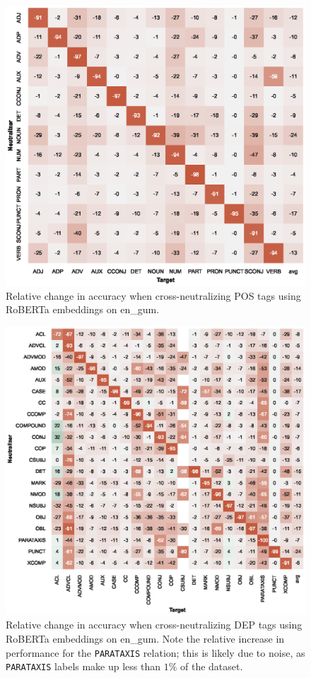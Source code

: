 \documentclass[11pt,a4paper]{article}
\begin{document}
\begin{figure}[t]
    \centering
    \includegraphics{full_figures/POS_xlm-roberta-base_en_gum_acc_drop_agg=max_probe=9.eps}
    \caption{Relative change in accuracy when cross-neutralizing POS tags using RoBERTa embeddings on en\_gum.}
    \label{fig:xneutr_roberta_pos_complete}
\end{figure}

\begin{figure}[t]
    \centering
    \includegraphics{full_figures/DEP_roberta-base_en_gum_acc_drop_agg=mean_probe=3_concat-mode=ONLY.eps}
    \caption{Relative change in accuracy when cross-neutralizing DEP tags using RoBERTa embeddings on en\_gum. Note the relative increase in performance for the \texttt{PARATAXIS} relation; this is likely due to noise, as \texttt{PARATAXIS} labels make up less than $1\%$ of the dataset.}
    \label{fig:xneutr_roberta_dep_complete}
\end{figure}
\end{document}
